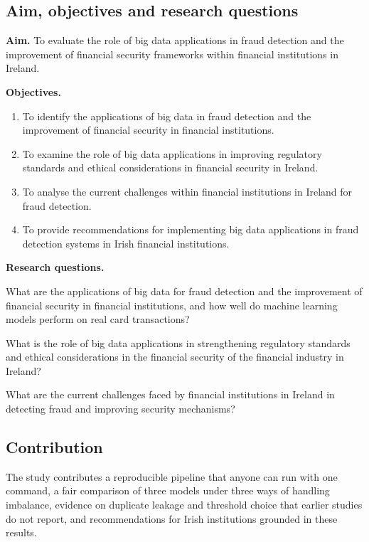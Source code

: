 \documentclass[12pt,a4paper]{article}
\begin{document}
\subsection{Aim, objectives and research questions}
\textbf{Aim.} To evaluate the role of big data applications in fraud detection and the improvement of financial security frameworks within financial institutions in Ireland.

\textbf{Objectives.}
\begin{enumerate}[nosep]
\item To identify the applications of big data in fraud detection and the improvement of financial security in financial institutions.
\item To examine the role of big data applications in improving regulatory standards and ethical considerations in financial security in Ireland.
\item To analyse the current challenges within financial institutions in Ireland for fraud detection.
\item To provide recommendations for implementing big data applications in fraud detection systems in Irish financial institutions.
\end{enumerate}

\textbf{Research questions.}
\begin{description}[nosep,leftmargin=1.2cm,labelwidth=1cm]
\item[RQ1] What are the applications of big data for fraud detection and the improvement of financial security in financial institutions, and how well do machine learning models perform on real card transactions?
\item[RQ2] What is the role of big data applications in strengthening regulatory standards and ethical considerations in the financial security of the financial industry in Ireland?
\item[RQ3] What are the current challenges faced by financial institutions in Ireland in detecting fraud and improving security mechanisms?
\end{description}

\subsection{Contribution}
The study contributes a reproducible pipeline that anyone can run with one command, a fair comparison of three models under three ways of handling imbalance, evidence on duplicate leakage and threshold choice that earlier studies do not report, and recommendations for Irish institutions grounded in these results.
\end{document}

